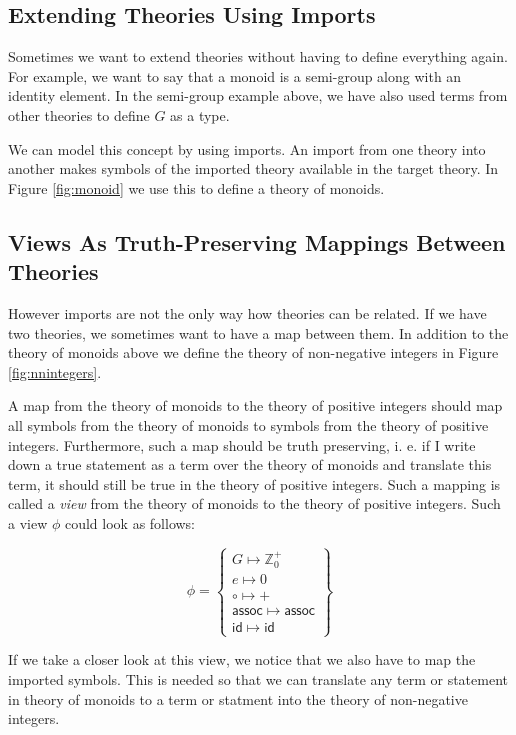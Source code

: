 \subsection{Extending Theories Using Imports}

Sometimes we want to extend theories without having to define everything again. For example, we want to say that a monoid is a semi-group along with an identity element. In the semi-group example above, we have also used terms from other theories to define $G$ as a type.

We can model this concept by using imports. An import from one theory into another makes symbols of the imported theory available in the target theory. In Figure \ref{fig:monoid} we use this to define a theory of monoids.



\subsection{Views As Truth-Preserving Mappings Between Theories}

However imports are not the only way how theories can be related. If we have two theories, we sometimes want to have a map between them. In addition to the theory of monoids above we define the theory of non-negative integers in Figure \ref{fig:nnintegers}.



A map from the theory of monoids to the theory of positive integers should map all symbols from the theory of monoids to symbols from the theory of positive integers. Furthermore, such a map should be truth preserving, i. e. if I write down a true statement as a term over the theory of monoids and translate this term, it should still be true  in the theory of positive integers. Such a mapping is called a \textit{view} from the theory of monoids to the theory of positive integers. Such a view $\phi$ could look as follows:

\[
  \phi=\left\{\begin{array}{l}
  G \mapsto \mathbb{Z}^{+}_{0}\\
  e \mapsto 0\\
  \circ \mapsto +\\
  \mathsf{assoc} \mapsto \mathsf{assoc}\\
  \mathsf{id} \mapsto \mathsf{id}
  \end{array}\right\}
\]

If we take a closer look at this view, we notice that we also have to map the imported symbols. This is needed so that we can translate any term or statement in theory of monoids to a term or statment into the theory of non-negative integers.

